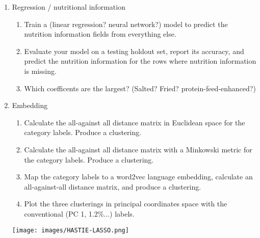 \documentclass[12pt]{book}
\theoremstyle{definition}
\begin{document}
\begin{enumerate}[label=(\alph*)]
  \item Regression / nutritional information
  \begin{enumerate}
    \item Train a (linear regression?  neural network?)  model to predict the nutrition information fields from everything else.  
    \item  Evaluate your model on a testing holdout set, report its accuracy, and predict the nutrition information for the rows where nutrition information is missing.
    \item  Which coefficents are the largest?  (Salted?  Fried?  protein-feed-enhanced?)

  \end{enumerate}

  \item Embedding 
  \begin{enumerate}
    \item Calculate the all-against all distance matrix in Euclidean space for the category labels.  Produce a clustering.
    \item Calculate the all-against all distance matrix with a Minkowski metric for the category labels.  Produce a clustering.
    \item Map the category labels to a word2vec language embedding, calculate an all-against-all distance matrix, and produce a clustering. 
    \item Plot the three clusterings in principal coordinates space with the conventional (PC 1, 1.2\%...) labels.
  \end{enumerate}

\texttt{[image: images/HASTIE-LASSO.png]}


\end{enumerate}
\end{document}
